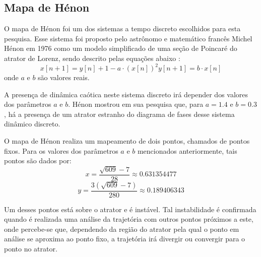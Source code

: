 \documentclass[a4paper, 12pt]{article}
\begin{document}
\subsection{Mapa de Hénon}

O mapa de Hénon foi um dos sistemas a tempo discreto escolhidos para esta pesquisa. Esse sistema foi proposto pelo astrônomo e matemático francês  Michel Hénon em 1976 como um modelo simplificado de uma seção de Poincaré do atrator de Lorenz, sendo descrito pelas equações abaixo \cite{henon1976two}:
\begin{subequations}
\begin{equation}
x[n+1] = y[n] + 1 - a\cdot (x[n])^2
\end{equation}
\begin{equation}
y[n+1] = b \cdot x[n]
\end{equation}
\end{subequations}
onde $a$ e $b$ são valores reais.

A presença de dinâmica caótica neste sistema discreto irá depender dos valores dos parâmetros $a$ e $b$. Hénon mostrou em sua pesquisa que, para $a = 1.4$ e $b = 0.3$, há a presença de um atrator estranho do diagrama de fases desse sistema dinâmico discreto. 

O mapa de Hénon realiza um mapeamento de dois pontos, chamados de pontos fixos. Para os valores dos parâmetros $a$ e $b$ mencionados anteriormente, tais pontos são dados por:
$$x = \frac{\sqrt{609}-7}{28} \approx 0.631354477$$
$$y = \frac{3(\sqrt{609}-7)}{280} \approx 0.189406343$$

Um desses pontos está sobre o atrator e é instável. Tal instabilidade é confirmada quando é realizada uma análise da trajetória com outros pontos próximos a este, onde percebe-se que, dependendo da região do atrator pela qual o ponto em análise se aproxima ao ponto fixo, a trajetória irá divergir ou convergir para o ponto no atrator. 
\end{document}
